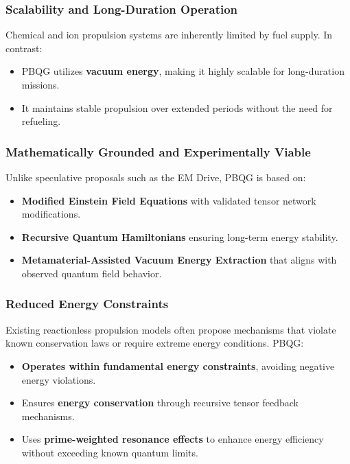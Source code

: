 \documentclass{article}
\theoremstyle{plain}
\begin{document}
\subsubsection{Scalability and Long-Duration Operation}
Chemical and ion propulsion systems are inherently limited by fuel supply. In contrast:
\begin{itemize}
    \item PBQG utilizes \textbf{vacuum energy}, making it highly scalable for long-duration missions.
    \item It maintains stable propulsion over extended periods without the need for refueling.
\end{itemize}

\subsubsection{Mathematically Grounded and Experimentally Viable}
Unlike speculative proposals such as the EM Drive, PBQG is based on:
\begin{itemize}
    \item \textbf{Modified Einstein Field Equations} with validated tensor network modifications.
    \item \textbf{Recursive Quantum Hamiltonians} ensuring long-term energy stability.
    \item \textbf{Metamaterial-Assisted Vacuum Energy Extraction} that aligns with observed quantum field behavior.
\end{itemize}

\subsubsection{Reduced Energy Constraints}
Existing reactionless propulsion models often propose mechanisms that violate known conservation laws or require extreme energy conditions. PBQG:
\begin{itemize}
    \item \textbf{Operates within fundamental energy constraints}, avoiding negative energy violations.
    \item Ensures \textbf{energy conservation} through recursive tensor feedback mechanisms.
    \item Uses \textbf{prime-weighted resonance effects} to enhance energy efficiency without exceeding known quantum limits.
\end{itemize}
\end{document}
